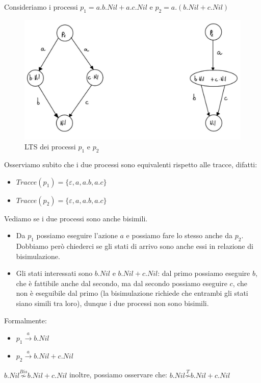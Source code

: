 \begin{esempio}
    Consideriamo i processi $p_1 = a . b . Nil + a . c . Nil$ e
    $p_2 = a . (b . Nil + c . Nil)$
    \begin{figure}[!ht]
        \centering
        \includegraphics[scale=0.25]{img/ccs/Esempio1.png}
        \caption{LTS dei processi $p_1$ e $p_2$}
    \end{figure}
    Osserviamo subito che i due processi sono equivalenti rispetto alle tracce,
    difatti:
    \begin{itemize}
        \item $Tracce(p_1) = \{\varepsilon, a, a . b, a . c\}$
        \item $Tracce(p_2) = \{\varepsilon, a, a . b, a . c\}$
    \end{itemize}
    Vediamo se i due processi sono anche bisimili.
    \begin{itemize}
        \item Da $p_1$ possiamo eseguire l'azione $a$ e possiamo fare lo stesso
              anche da $p_2$. Dobbiamo però chiederci se gli stati di arrivo sono
              anche essi in relazione di bisimulazione.
        \item Gli stati interessati sono $b . Nil$ e $b . Nil + c .
                  Nil$: dal primo possiamo eseguire $b$, che è fattibile anche
              dal secondo, ma dal secondo possiamo eseguire $c$, che non è
              eseguibile dal primo (la bisimulazione richiede che entrambi gli
              stati siano simili tra loro), dunque i due processi non sono bisimili.
    \end{itemize}
    Formalmente:
    \begin{itemize}
        \item $p_1 \xrightarrow{a} b . Nil$
        \item $p_2 \xrightarrow{a} b . Nil + c . Nil$
    \end{itemize}
    $b . Nil \stackrel{Bis}{\not\sim} b . Nil + c . Nil$ inoltre,
    possiamo osservare che: $b . Nil \stackrel{T}{\not\sim} b . Nil + c . Nil$
\end{esempio}
